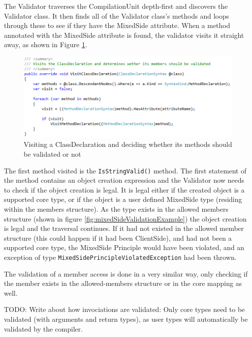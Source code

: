 		The Validator traverses the CompilationUnit depth-first and discovers the Validator class. It then finds all of the Validator class's methods and loops through these to see if they have the MixedSide attribute. When a method annotated with the MixedSide attribute is found, the validator visits it straight away, as shown in Figure \ref{fig:ValidatorVisitClassDeclaration}. 

		\begin{figure}[H]
			\begin{center}
				\centerline{\includegraphics[width=14cm]{resources/images/ValidatorVisitClassDeclaration.png}}
			\end{center}
			\caption{Visiting a ClassDeclaration and deciding whether its methods should be validated or not}
			\label{fig:ValidatorVisitClassDeclaration}
		\end{figure}

		The first method visited is the \texttt{IsStringValid()} method. The first statement of the method contains an object creation expression and the Validator now needs to check if the object creation is legal. It is legal either if the created object is a supported core type, or if the object is a user defined MixedSide type (residing within the members structure). As the type exists in the allowed members structure (shown in figure \ref{fig:mixedSideValidationExample}) the object creation is legal and the traversal continues. If it had not existed in the allowed member structure (this could happen if it had been ClientSide), and had not been a supported core type, the MixedSide Principle would have been violated, and an exception of type \texttt{MixedSidePrincipleViolatedException} had been thrown.

		The validation of a member access is done in a very similar way, only checking if the member exists in the allowed-members structure or in the core mapping as well.

		TODO: Write about how invociations are validated: Only core types need to be validated (with arguments and return types), as user types will automatically be validated by the compiler.



